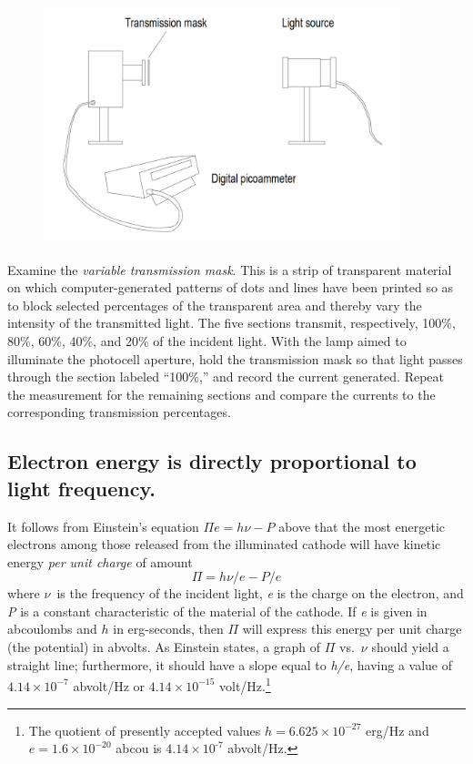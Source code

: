 \begin{figure}[h]
  \begin{center}
  \includegraphics[width=4.08333in,height=2.77083in]{images/06_einstein/001.png}
  \end{center}
\end{figure}

Examine the \emph{variable transmission mask}. This is a strip of
transparent material on which computer-generated patterns of dots and
lines have been printed so as to block selected percentages of the
transparent area and thereby vary the intensity of the transmitted
light. The five sections transmit, respectively, 100\%, 80\%, 60\%,
40\%, and 20\% of the incident light. With the lamp aimed to illuminate
the photocell aperture, hold the transmission mask so that light passes
through the section labeled ``100\%,'' and record the current generated.
Repeat the measurement for the remaining sections and compare the
currents to the corresponding transmission percentages.

\subsection{Electron energy is directly proportional to light frequency.}

It follows from Einstein's equation $\Pi e = h\nu - P$
above that the most energetic electrons among those released from the
illuminated cathode will have kinetic energy \emph{per unit charge} of
amount
\begin{equation*}
\Pi = h\nu/e - P/e
\end{equation*}
where $\nu$~is the frequency of the incident light, \emph{e} is the
charge on the electron, and \emph{P} is a constant characteristic of the
material of the cathode. If \emph{e} is given in abcoulombs and $h$
in erg-seconds, then $\Pi$ will express this energy per unit charge
(the potential) in abvolts. As Einstein states, a
graph of $\Pi$ vs.\ $\nu$ should yield a straight line;
furthermore, it should have a slope equal to \emph{h/e}, having a value
of $4.14\times 10^{-7}$ abvolt/Hz or $4.14\times 10^{-15}$ volt/Hz.\footnote{The
  quotient of presently accepted values $h = 6.625\times 10^{-27}$ erg/Hz
  and $e = 1.6\times 10^{-20}$ abcou is $4.14\times 10^{‑7}$ abvolt/Hz.}

